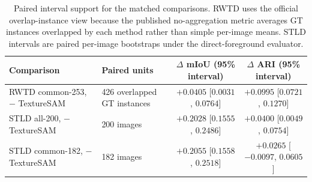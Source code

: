 \begin{table}[t]
\centering
\scriptsize
\setlength{\tabcolsep}{5pt}
\renewcommand{\arraystretch}{0.98}
\begin{tabularx}{\textwidth}{@{}p{}p{}cc@{}}
\toprule
Comparison & Paired units & $\Delta$ mIoU (95\% interval) & $\Delta$ ARI (95\% interval) \\
\midrule
RWTD common-253, \sys{} $-$ TextureSAM & 426 overlapped GT instances & $+0.0405$ [$0.0031$, $0.0764$] & $+0.0995$ [$0.0721$, $0.1270$] \\
STLD all-200, \sys{} $-$ TextureSAM & 200 images & $+0.2028$ [$0.1555$, $0.2486$] & $+0.0400$ [$0.0049$, $0.0754$] \\
STLD common-182, \sys{} $-$ TextureSAM & 182 images & $+0.2055$ [$0.1558$, $0.2518$] & $+0.0265$ [$-0.0097$, $0.0605$] \\
\bottomrule
\end{tabularx}
\caption{Paired interval support for the matched comparisons. RWTD uses the official overlap-instance view because the published no-aggregation metric averages GT instances overlapped by each method rather than simple per-image means. STLD intervals are paired per-image bootstraps under the direct-foreground evaluator.}
\label{tab:bootstrap_support}
\end{table}
